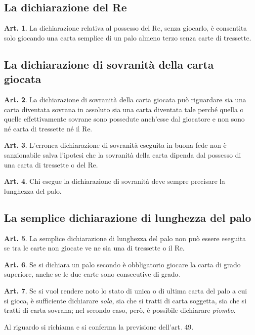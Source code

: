 \documentclass[italian,a4paper]{article}
\theoremstyle{definition}
\newtheorem{art}{Art.}
\begin{document}
\subsection*{La dichiarazione del Re}

\begin{art}
La dichiarazione relativa al possesso del Re, senza giocarlo, è consentita
solo giocando una carta semplice di un palo almeno terzo senza carte di
tressette.
\end{art}

\subsection*{La dichiarazione di sovranità della carta giocata}

\begin{art}
La dichiarazione di sovranità della carta giocata può riguardare sia una
carta diventata sovrana in assoluto sia una carta diventata tale perch\'e
quella o quelle effettivamente sovrane sono possedute anch’esse dal
giocatore e non sono n\'e carta di tressette n\'e il Re.
\end{art}

\begin{art}
L’erronea dichiarazione di sovranità eseguita in buona fede non è
sanzionabile salva l’ipotesi che la sovranità della carta dipenda dal
possesso di una carta di tressette o del Re.
\end{art}

\begin{art}
Chi esegue la dichiarazione di sovranità deve sempre precisare la lunghezza
del palo.
\end{art}

\subsection*{La semplice dichiarazione di lunghezza del palo}

\begin{art}
La semplice dichiarazione di lunghezza del palo non può essere eseguita se
tra le carte non giocate ve ne sia una di tressette o il Re.
\end{art}

\begin{art}
Se si dichiara un palo secondo è obbligatorio giocare la carta di grado
superiore, anche se le due carte sono consecutive di grado.
\end{art}

\begin{art}
Se si vuol rendere noto lo stato di unica o di ultima carta del palo a cui
si gioca,  è sufficiente dichiarare \emph{sola}, sia che si tratti di carta
soggetta, sia che si tratti di carta sovrana; nel secondo caso, però, è
possibile dichiarare \emph{piombo}.

Al riguardo si richiama e si conferma la previsione dell’art. 49.
\end{art}
\end{document}
